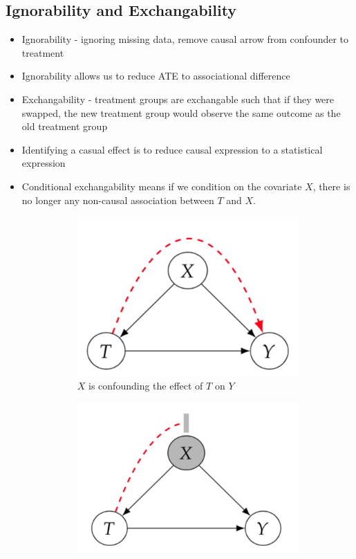 \documentclass[../main.tex]{subfiles}
\begin{document}
  \subsection{Ignorability and Exchangability}
    \begin{itemize}
      \item Ignorability - ignoring missing data, remove causal arrow from confounder to treatment
      \item Ignorability allows us to reduce ATE to associational difference
      \item Exchangability - treatment groups are exchangable such that if they were swapped, the new treatment group would observe the same outcome as the old treatment group
      \item Identifying a casual effect is to reduce causal expression to a statistical expression
      \item Conditional exchangability means if we condition on the covariate $X$, there is no longer any non-causal association between $T$ and $X$.
      \begin{figure}[h]
        \caption{Causal graphical models}
        \centering
        \begin{subfigure}{.5\textwidth}
          \centering
          \includegraphics[width=.7\linewidth]{../imgs/confounding.png}
          \caption{$X$ is confounding the effect of $T$ on $Y$}
          \label{fig:confounding}
        \end{subfigure}%
        \begin{subfigure}{.5\textwidth}
          \centering
          \includegraphics[width=.7\linewidth]{../imgs/blocking.png}

\end{subfigure}
\end{figure}
\end{itemize}
\end{document}
